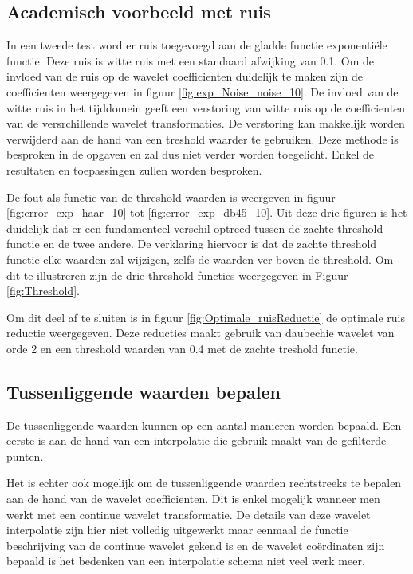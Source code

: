 \subsection{Academisch voorbeeld met ruis}

In een tweede test word er ruis toegevoegd aan de gladde functie exponenti\"ele functie.
Deze ruis is witte ruis met een standaard afwijking van 0.1.
Om de invloed van de ruis op de wavelet coefficienten duidelijk te maken zijn de coefficienten weergegeven in 
figuur \ref{fig:exp_Noise_noise_10}.
De invloed van de witte ruis in het tijddomein geeft  een verstoring van witte ruis op de coefficienten van de versrchillende wavelet transformaties.
De verstoring kan makkelijk worden verwijderd aan de hand van een treshold waarder te gebruiken.
Deze methode is besproken in de opgaven en zal dus niet verder worden toegelicht.
Enkel de resultaten en toepassingen zullen worden besproken.

De fout als functie van de threshold waarden is weergeven in figuur \ref{fig:error_exp_haar_10} tot \ref{fig:error_exp_db45_10}.
Uit deze drie figuren is het duidelijk dat er een fundamenteel verschil optreed tussen de zachte threshold functie en de twee andere.
De verklaring hiervoor is dat de zachte threshold functie elke waarden zal wijzigen, zelfs de waarden ver boven de threshold.
Om dit te illustreren zijn de drie threshold functies weergegeven in Figuur \ref{fig:Threshold}.

Om dit deel af te sluiten is in figuur \ref{fig:Optimale_ruisReductie} de optimale ruis reductie weergegeven.
Deze reducties maakt gebruik van daubechie wavelet van orde 2 en een threshold waarden van 0.4 met  de zachte treshold functie.


\subsection{Tussenliggende waarden bepalen}

De tussenliggende waarden kunnen op een aantal manieren worden bepaald.
Een eerste is aan de hand van een interpolatie die gebruik maakt van de gefilterde punten.

Het is echter ook mogelijk om de tussenliggende waarden rechtstreeks te bepalen aan de hand van de wavelet coefficienten.
Dit is enkel mogelijk wanneer men werkt met een continue wavelet transformatie.
De details van deze wavelet interpolatie zijn hier niet volledig uitgewerkt maar eenmaal de functie beschrijving van de continue wavelet gekend is en de wavelet co\"erdinaten zijn bepaald is het bedenken van een interpolatie schema niet veel werk meer.


